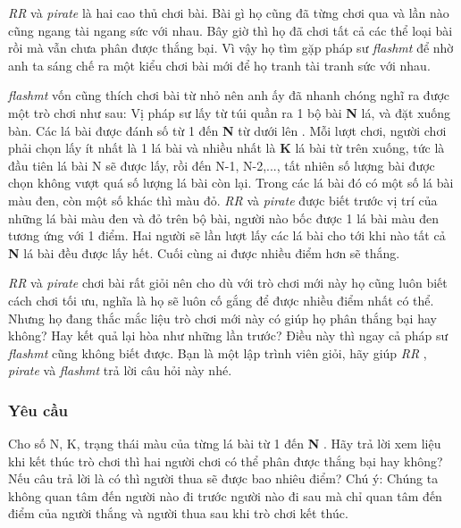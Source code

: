 



\emph{    RR   }   và   \emph{    pirate   }   là hai cao thủ chơi bài. Bài gì họ cũng đã từng chơi qua và lần nào cũng ngang tài ngang sức với nhau. Bây giờ thì họ đã chơi tất cả các thể loại bài rồi mà vẫn chưa phân được thắng bại. Vì vậy họ tìm gặp pháp sư   \emph{    flashmt   }   để nhờ anh ta sáng chế ra một kiểu chơi bài mới để họ tranh tài tranh sức với nhau.  

\emph{    flashmt   }   vốn cũng thích chơi bài từ nhỏ nên anh ấy đã nhanh chóng nghĩ ra được một trò chơi như sau: Vị pháp sư lấy từ túi quần ra 1 bộ bài   \textbf{    N   }   lá, và đặt xuống bàn.       Các lá bài được đánh số từ 1 đến    \textbf{     N    }    từ dưới lên      . Mỗi lượt chơi, người chơi phải chọn lấy ít nhất là 1 lá bài và nhiều nhất là   \textbf{    K   }   lá bài từ trên xuống, tức là đầu tiên lá bài N sẽ được lấy, rồi đến N-1, N-2,..., tất nhiên số lượng bài được chọn không vượt quá số lượng lá bài còn lại. Trong các lá bài đó có một số lá bài màu đen, còn một số khác thì màu đỏ.   \emph{    RR   }   và   \emph{    pirate   }   được biết trước vị trí của những lá bài màu đen và đỏ trên bộ bài, người nào bốc được 1 lá bài màu đen tương ứng với 1 điểm. Hai người sẽ lần lượt lấy các lá bài cho tới khi nào tất cả   \textbf{    N   }   lá bài đều được lấy hết. Cuối cùng ai được nhiều điểm hơn sẽ thắng.  

\emph{    RR   }   và   \emph{    pirate   }   chơi bài rất giỏi nên cho dù với trò chơi mới này họ cũng luôn biết cách chơi tối ưu, nghĩa là họ sẽ luôn cố gắng để được nhiều điểm nhất có thể. Nhưng họ đang thắc mắc liệu trò chơi mới này có giúp họ phân thắng bại hay không? Hay kết quả lại hòa như những lần trước? Điều này thì ngay cả pháp sư   \emph{    flashmt   }   cũng không biết được. Bạn là một lập trình viên giỏi, hãy giúp   \emph{    RR   }   ,   \emph{    pirate   }   và   \emph{    flashmt   }   trả lời câu hỏi này nhé.  

\subsubsection{\textbf{    Yêu cầu   }}

   Cho số N, K, trạng thái màu của từng lá bài từ 1 đến   \textbf{    N   }   . Hãy trả lời xem liệu khi kết thúc trò chơi thì hai người chơi có thể phân được thắng bại hay không? Nếu câu trả lời là có thì người       thua      sẽ được bao nhiêu điểm? Chú ý: Chúng ta không quan tâm đến người nào đi trước người nào đi sau mà chỉ quan tâm đến điểm của người thắng và người thua sau khi trò chơi kết thúc.  

